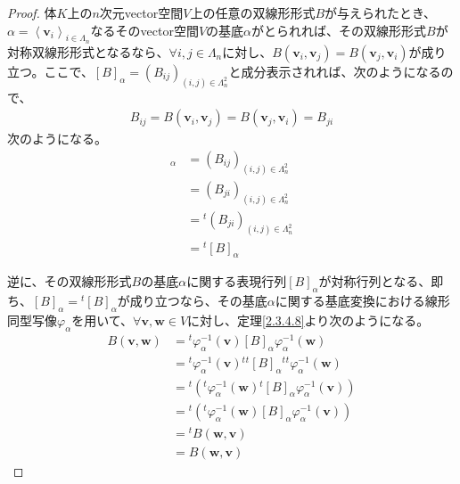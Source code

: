 \documentclass[dvipdfmx]{jsarticle}
\begin{document}
\begin{proof}
体$K$上の$n$次元vector空間$V$上の任意の双線形形式$B$が与えられたとき、$\alpha = \left\langle \mathbf{v}_{i} \right\rangle_{i \in \varLambda_{n}}$なるそのvector空間$V$の基底$\alpha$がとられれば、その双線形形式$B$が対称双線形形式となるなら、$\forall i,j \in \varLambda_{n}$に対し、$B\left( \mathbf{v}_{i},\mathbf{v}_{j} \right) = B\left( \mathbf{v}_{j},\mathbf{v}_{i} \right)$が成り立つ。ここで、$[ B]_{\alpha} = \left( B_{ij} \right)_{(i,j) \in \varLambda_{n}^{2}}$と成分表示されれば、次のようになるので、
\begin{align*}
B_{ij} = B\left( \mathbf{v}_{i},\mathbf{v}_{j} \right) = B\left( \mathbf{v}_{j},\mathbf{v}_{i} \right) = B_{ji}
\end{align*}
次のようになる。
\begin{align*}
[ B]_{\alpha} &= \left( B_{ij} \right)_{(i,j) \in \varLambda_{n}^{2}}\\
&= \left( B_{ji} \right)_{(i,j) \in \varLambda_{n}^{2}}\\
&={}^{t}\left( B_{ji} \right)_{(i,j) \in \varLambda_{n}^{2}}\\
&={}^{t}[ B]_{\alpha}
\end{align*}\par
逆に、その双線形形式$B$の基底$\alpha$に関する表現行列$[ B]_{\alpha}$が対称行列となる、即ち、$[ B]_{\alpha} ={}^{t}[ B]_{\alpha}$が成り立つなら、その基底$\alpha$に関する基底変換における線形同型写像$\varphi_{\alpha}$を用いて、$\forall\mathbf{v},\mathbf{w} \in V$に対し、定理\ref{2.3.4.8}より次のようになる。
\begin{align*}
B\left( \mathbf{v},\mathbf{w} \right) &={}^{t}\varphi_{\alpha}^{- 1}\left( \mathbf{v} \right)[ B]_{\alpha}\varphi_{\alpha}^{- 1}\left( \mathbf{w} \right)\\
&={}^{t}\varphi_{\alpha}^{- 1}\left( \mathbf{v} \right){}^{t}{}^{t}[ B]_{\alpha}{}^{t}{}^{t}\varphi_{\alpha}^{- 1}\left( \mathbf{w} \right)\\
&={}^{t}\left({}^{t}\varphi_{\alpha}^{- 1}\left( \mathbf{w} \right){}^{t}[ B]_{\alpha}\varphi_{\alpha}^{- 1}\left( \mathbf{v} \right) \right)\\
&={}^{t}\left({}^{t}\varphi_{\alpha}^{- 1}\left( \mathbf{w} \right)[ B]_{\alpha}\varphi_{\alpha}^{- 1}\left( \mathbf{v} \right) \right)\\
&={}^{t}B\left( \mathbf{w},\mathbf{v} \right)\\
&= B\left( \mathbf{w},\mathbf{v} \right)
\end{align*}
\end{proof}
\end{document}
